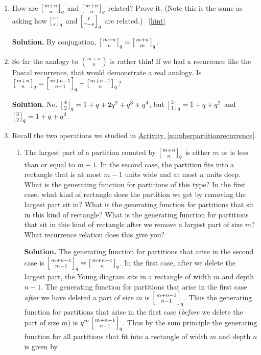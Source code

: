 \documentclass{book}
\begin{document}
\begin{activity}[]
\begin{enumerate}[font=\bfseries,label=(\alph*),ref=\alph*]
\item\label{task-284} \hypertarget{p-1691}{}%
How are \(\left[{m+n\atop n}\right]_q\) and \(\left[{m+n\atop n}\right]_q\) related? Prove it. (Note this is the same as asking how \(\left[{r\atop s}\right]_q\) and \(\left[{r\atop r-s}\right]_q\) are related.)%
~\hfill{\tiny\hyperlink{a-327.c}{[hint]}\hypertarget{q-327.c}{}}\par\smallskip%
\noindent\textbf{Solution.}\hypertarget{solution-265}{}\quad%
\hypertarget{p-1693}{}%
By conjugation, \(\left[{m+n\atop n}\right]_q=\left[{m+n\atop m}\right]_q\).%
\item\label{task-285} \hypertarget{p-1694}{}%
So far the analogy to \(\binom{m+n}{n}\) is rather thin! If we had a recurrence like the Pascal recurrence, that would demonstrate a real analogy. Is \(\left[{m+n\atop n}\right]_q= \left[{m+n-1\atop n-1}\right]_q+\left[{m+n-1\atop n}\right]_q\)?%
\par\smallskip%
\noindent\textbf{Solution.}\hypertarget{solution-266}{}\quad%
\hypertarget{p-1695}{}%
No. \(\left[{4\atop2}\right]_q=1+q+2q^2+q^3+q^4\), but \(\left[{3\atop1}\right]_q=1+q+q^2\) and \(\left[{3\atop2}\right]_q=1+q+q^2\).%
\item\label{task-286} \hypertarget{p-1696}{}%
Recall the two operations we studied in \hyperref[numberpartitionrecurrence]{Activity~\ref{numberpartitionrecurrence}}.%
\begin{enumerate}[font=\bfseries,label=(\roman*),ref=\theenumi.\roman*]
\item\label{task-287} \hypertarget{p-1697}{}%
The largest part of a partition counted by \(\left[{m+n\atop n}\right]_q\) is either \(m\) or is less than or equal to \(m-1\).  In the second case, the partition fits into a rectangle that is at most \(m-1\) units wide and at most \(n\) units deep.  What is the generating function for partitions of this type?  In the first case, what kind of rectangle does the partition we get by removing the largest part sit in?  What is the generating function for partitions that sit in this kind of rectangle?  What is the generating function for partitions that sit in this kind of rectangle after we remove a largest part of size \(m\)?  What recurrence relation does this give you?%
\par\smallskip%
\noindent\textbf{Solution.}\hypertarget{solution-267}{}\quad%
\hypertarget{p-1698}{}%
The generating function for partitions that arise in the second case is \(\left[{m+n-1\atop m-1}\right]_q=\left[{m+n-1\atop n}\right]_q\). In the first case, after we delete the largest part, the Young diagram sits in a rectangle of width \(m\) and depth \(n-1\). The generating function for partitions that arise in the first case \emph{after} we have deleted a part of size \(m\) is \(\left[{m+n-1\atop n-1}\right]_q\). Thus the generating function for partitions that arise in the first case (\emph{before} we delete the part of size \(m\)) is \(q^m\left[{m+n-1\atop n-1}\right]_q\). Thus by the sum principle the generating function for all partitions that fit into a rectangle of width \(m\) and depth \(n\) is given by%

\end{enumerate}
\end{enumerate}
\end{activity}
\end{document}
